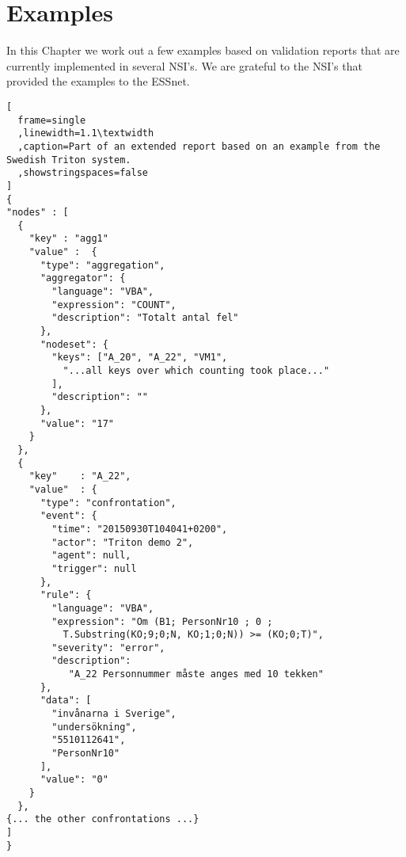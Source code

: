 \section{Examples}
\label{sect:examples}
In this Chapter we work out a few examples based on validation reports that are
currently implemented in several NSI's. We are grateful to the NSI's that
provided the examples to  the ESSnet.

\begin{lstlisting}[
  frame=single
  ,linewidth=1.1\textwidth
  ,caption=Part of an extended report based on an example from the Swedish Triton system.
  ,showstringspaces=false
]
{
"nodes" : [
  { 
    "key" : "agg1"
    "value" :  {
      "type": "aggregation",
      "aggregator": {
        "language": "VBA",
        "expression": "COUNT",
        "description": "Totalt antal fel"
      },
      "nodeset": {
        "keys": ["A_20", "A_22", "VM1",
          "...all keys over which counting took place..."
        ],
        "description": ""
      },
      "value": "17"
    }
  },
  {
    "key"    : "A_22",
    "value"  : {
      "type": "confrontation",
      "event": {
        "time": "20150930T104041+0200",
        "actor": "Triton demo 2",
        "agent": null,
        "trigger": null
      },
      "rule": {
        "language": "VBA",
        "expression": "Om (B1; PersonNr10 ; 0 ; 
          T.Substring(KO;9;0;N, KO;1;0;N)) >= (KO;0;T)",
        "severity": "error",
        "description": 
           "A_22 Personnummer måste anges med 10 tekken"
      },
      "data": [
        "invånarna i Sverige",
        "undersökning",
        "5510112641",
        "PersonNr10"
      ],
      "value": "0"
    }
  },
{... the other confrontations ...}
]
}
\end{lstlisting}

